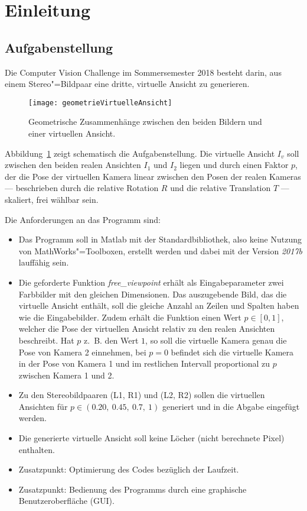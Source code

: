 \section{Einleitung}

\subsection{Aufgabenstellung}
Die Computer Vision Challenge im Sommersemester 2018 besteht darin, aus einem Stereo"=Bildpaar eine dritte, virtuelle Ansicht zu generieren.

\begin{figure}[!h]
	\centering
	\texttt{[image: geometrieVirtuelleAnsicht]}
	\caption{Geometrische Zusammenhänge zwischen den beiden Bildern und einer virtuellen Ansicht.}
	\label{fig:geometrie_virtuelle_ansicht}
\end{figure}

Abbildung~\ref{fig:geometrie_virtuelle_ansicht} zeigt schematisch die Aufgabenstellung. Die virtuelle Ansicht $I_v$ soll zwischen den beiden realen Ansichten $I_1$ und $I_2$ liegen und durch einen Faktor $p$, der die Pose der virtuellen Kamera linear zwischen den  Posen der realen Kameras --- beschrieben durch die relative Rotation $R$ und die relative Translation $T$ --- skaliert, frei wählbar sein.

Die Anforderungen an das Programm sind:
\begin{itemize}
\item Das Programm soll in Matlab mit der Standardbibliothek, also keine Nutzung von MathWorks"=Toolboxen, erstellt werden und dabei mit der Version \textit{2017b} lauffähig sein.
\item Die geforderte Funktion \textit{free\_viewpoint} erhält als Eingabeparameter zwei Farbbilder mit den gleichen Dimensionen. Das auszugebende Bild, das die virtuelle Ansicht enthält, soll die gleiche Anzahl an Zeilen und Spalten haben wie die Eingabebilder. Zudem erhält die Funktion einen Wert $p \in [0, 1]$, welcher die Pose der virtuellen Ansicht relativ zu den realen Ansichten beschreibt. Hat $p$ z.~B. den Wert $1$, so soll die virtuelle Kamera genau die Pose von Kamera 2 einnehmen, bei $p = 0$ befindet sich die virtuelle Kamera in der Pose von Kamera 1 und im restlichen Intervall proportional zu $p$ zwischen Kamera 1 und 2.
\item Zu den Stereobildpaaren (L1, R1) und (L2, R2) sollen die virtuellen Ansichten für $p \in (0.20,~0.45,~0.7,~1)$ generiert und in die Abgabe eingefügt werden.
\item Die generierte virtuelle Ansicht soll keine Löcher (nicht berechnete Pixel) enthalten.
\item Zusatzpunkt: Optimierung des Codes bezüglich der Laufzeit.
\item Zusatzpunkt: Bedienung des Programms durch eine graphische Benutzeroberfläche (GUI).
\end{itemize}

